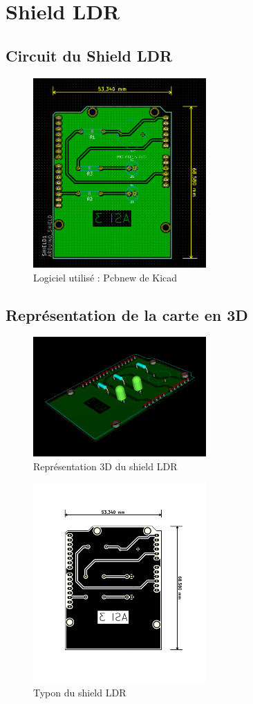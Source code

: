 \section{Shield LDR}
\subsection{Circuit du Shield LDR}
\begin{figure}[h]
	\centering
	\includegraphics[width=250px]{images/Apercu.png}
	\caption{Logiciel utilisé : Pcbnew de Kicad}
\end{figure}
\newpage
\subsection{Représentation de la carte en 3D}
\begin{figure}[h]
	\centering
	\includegraphics[width=250px]{images/3DLDR.png}
	\caption{Représentation 3D du shield LDR}
\end{figure}
\begin{figure}[h]
	\centering
	\includegraphics[width=250px]{images/typonLDR.png}
	\caption{Typon du shield LDR}
\end{figure}

